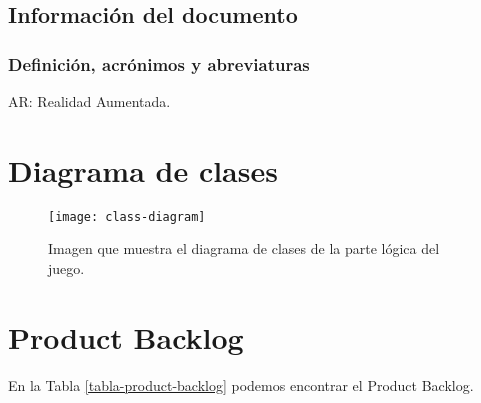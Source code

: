 \subsection{Información del documento}
\subsubsection{Definición, acrónimos y abreviaturas}
AR: Realidad Aumentada.\\

\newpage

\section{Diagrama de clases} \label{apendice-diagrama-de-clases}

\begin{figure}[!htb]
  \centering
  \texttt{[image: class-diagram]}
  \caption{Imagen que muestra el diagrama de clases de la parte lógica del juego.}
  \label{figura-class-diagram}
\end{figure}


\section{Product Backlog} \label{apendice-product-backlog}

En la Tabla \ref{tabla-product-backlog} podemos encontrar el Product Backlog.

